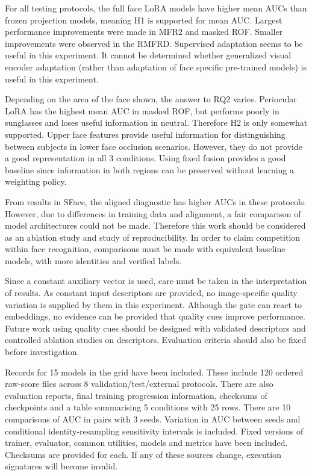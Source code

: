 \documentclass[10pt,lettersize,journal]{IEEEtran}
\begin{document}
For all testing protocols, the full face LoRA models have higher mean AUCs than frozen projection models, meaning H1 is supported for mean AUC. Largest performance improvements were made in MFR2 and masked ROF. Smaller improvements were observed in the RMFRD. Supervised adaptation seems to be useful in this experiment. It cannot be determined whether generalized visual encoder adaptation (rather than adaptation of face specific pre-trained models) is useful in this experiment.\par

Depending on the area of the face shown, the answer to RQ2 varies. Periocular LoRA has the highest mean AUC in masked ROF, but performs poorly in sunglasses and loses useful information in neutral. Therefore H2 is only somewhat supported. Upper face features provide useful information for distinguishing between subjects in lower face occlusion scenarios. However, they do not provide a good representation in all 3 conditions. Using fixed fusion provides a good baseline since information in both regions can be preserved without learning a weighting policy.\par

From results in SFace, the aligned diagnostic has higher AUCs in these protocols. However, due to differences in training data and alignment, a fair comparison of model architectures could not be made. Therefore this work should be considered as an ablation study and study of reproducibility. In order to claim competition within face recognition, comparisons must be made with equivalent baseline models, with more identities and verified labels.\par

Since a constant auxiliary vector is used, care must be taken in the interpretation of results. As constant input descriptors are provided, no image-specific quality variation is supplied by them in this experiment. Although the gate can react to embeddings, no evidence can be provided that quality cues improve performance. Future work using quality cues should be designed with validated descriptors and controlled ablation studies on descriptors. Evaluation criteria should also be fixed before investigation.\par

Records for 15 models in the grid have been included. These include 120 ordered raw-score files across 8 validation/test/external protocols. There are also evaluation reports, final training progression information, checksums of checkpoints and a table summarising 5 conditions with 25 rows. There are 10 comparisons of AUC in pairs with 3 seeds. Variation in AUC between seeds and conditional identity-resampling sensitivity intervals is included. Fixed versions of trainer, evaluator, common utilities, models and metrics have been included. Checksums are provided for each. If any of these sources change, execution signatures will become invalid.\par
\end{document}
